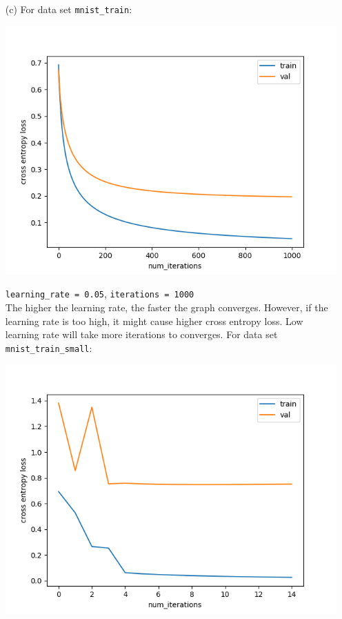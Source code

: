 \documentclass[12pt]{article}
\begin{document}
\begin{enumerate}
\begin{enumerate}
\begin{center}
        \end{center}
        \item[(c)] For data set \texttt{mnist\_train}:
        \begin{center}
          \includegraphics[scale=0.7]{q3/q3_2c_1.png}
        \end{center}
        \texttt{learning\_rate = 0.05}, \texttt{iterations = 1000} \\
        The higher the learning rate, the faster the graph converges. However, if the learning rate is too high, it might cause higher cross entropy loss. Low learning rate will take more iterations to converges.
        \newpage
        For data set \texttt{mnist\_train\_small}:
        \begin{center}
          \includegraphics[scale=0.7]{q3/q3_2c_2.png}

\end{center}
\end{enumerate}
\end{enumerate}
\end{document}
